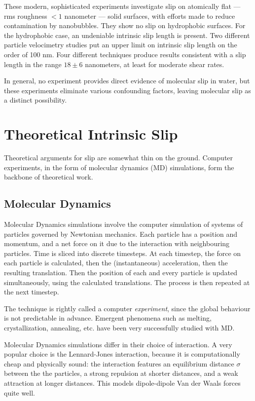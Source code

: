 \documentclass[12pt, a4paper, twoside, openright]{book}
\begin{document}
These modern, sophisticated experiments investigate slip on atomically flat --- rms roughness $< 1$ nanometer --- solid surfaces, with efforts made to reduce contamination by nanobubbles.  They show no slip on hydrophobic surfaces. For the hydrophobic case, an undeniable intrinsic slip length is present. Two different particle velocimetry studies put an upper limit on intrinsic slip length on the order of 100 nm.  Four different techniques produce results consistent with a slip length in the range $18 \pm 6$ nanometers, at least for moderate shear rates.

In general, no experiment provides direct evidence of molecular slip in water, but these experiments eliminate various confounding factors, leaving molecular slip as a distinct possibility.

\section{Theoretical Intrinsic Slip}

Theoretical arguments for slip are somewhat thin on the ground. Computer experiments, in the form of molecular dynamics (MD) simulations, form the backbone of theoretical work.

\subsection*{Molecular Dynamics}



Molecular Dynamics simulations involve the computer simulation of systems of particles governed by Newtonian mechanics.  Each particle has a position and momentum, and a net force on it due to the interaction with neighbouring particles. Time is sliced into discrete timesteps. At each timestep, the force on each particle is calculated, then the (instantaneous) acceleration, then the resulting translation. Then the position of each and every particle is updated simultaneously, using the calculated translations. The process is then repeated at the next timestep.

The technique is rightly called a computer \emph{experiment}, since the global behaviour is not predictable in advance.  Emergent phenomena such as melting, crystallization, annealing, etc. have been very successfully studied with MD.

Molecular Dynamics simulations differ in their choice of interaction. A very popular choice is the Lennard-Jones interaction, because it is computationally cheap and physically sound: the interaction features an equilibrium distance $\sigma$ between the the particles, a strong repulsion at shorter distances, and a weak attraction at longer distances.  This models dipole-dipole Van der Waals forces quite well.
\end{document}
